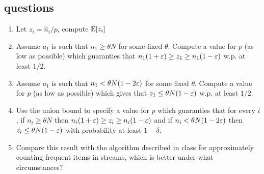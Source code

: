 \documentclass{article}
\begin{document}
\subsection*{questions}
\begin{enumerate}
\item Let $z_i = \hat{n}_{i}/p$, compute ${\mathbb E}[z_i]$
\item Assume $a_1$ is such that $n_1 \ge \theta N$ for some fixed $\theta$.
Compute a value for $p$ (as low as possible) which guaranties that $n_1 (1+\varepsilon)\ge z_1 \ge n_1 (1-\varepsilon)$ w.p. at least $1/2$. 
\item Assume $a_1$ is such that $n_1 < \theta N(1-2\varepsilon)$ for some fixed $\theta$.
Compute a value for $p$ (as low as possible) which gives that $z_1 \le \theta N(1-\varepsilon)$ w.p. at least $1/2$. 
\item Use the union bound to specify a value for $p$ which guaranties that for every $i$, if $n_i \ge \theta N$
then $n_i (1+\varepsilon)\ge z_i \ge n_i (1-\varepsilon)$ and if $n_i < \theta N (1-2\varepsilon)$ then $z_i \le \theta N (1-\varepsilon)$ with probability at least $1-\delta$. 
\item Compare this result with the algorithm described in class for approximately counting frequent items in streams, which is better under what circumstances?
\end{enumerate}
\end{document}
